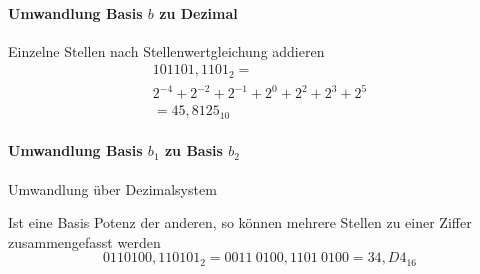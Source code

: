 \paragraph{Umwandlung Basis $b$ zu Dezimal}
\begin{items}
	\item Einzelne Stellen nach Stellenwertgleichung addieren
	\begin{multline*}
		101101,1101_2 = \\ 2^{-4}+2^{-2}+2^{-1}+2^0+2^2+2^3+2^5 \\ = 45,8125_{10}
	\end{multline*}
\end{items}

\paragraph{Umwandlung Basis $b_1$ zu Basis $b_2$}
\begin{enumeration}
	\item Umwandlung über Dezimalsystem
	\item Ist eine Basis Potenz der anderen, so können mehrere Stellen zu einer Ziffer zusammengefasst werden
	\begin{equation*}
		0110100,110101_2 = 0011 \ 0100,1101 \ 0100 = 34,D4_{16}
	\end{equation*}
\end{enumeration}

\newpage

